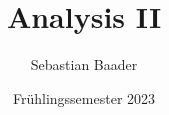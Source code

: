 \documentclass[11pt]{report}
\theoremstyle{definition}
\begin{document}
\renewcommand{\thechapter}{\Roman{chapter}}
\renewcommand{\thesection}{\arabic{section}}

\title{Analysis II}
\author{Sebastian Baader}
\date{Frühlingssemester 2023}
\maketitle



\tableofcontents







\nocite{*}

\end{document}
